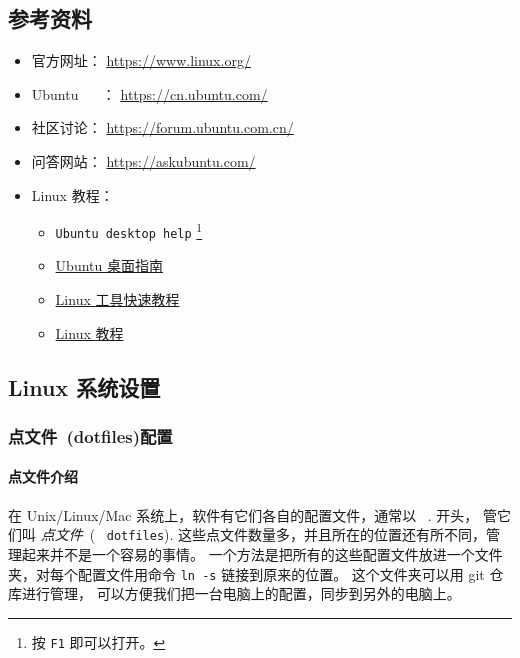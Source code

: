 \documentclass[cn,11pt, simple]{elegantbook}
\begin{document}
\subsection{参考资料}%
\label{sub:linux-refs}

\begin{itemize}
    \item 官方网址： \href{https://www.linux.org/}{https://www.linux.org/}
    \item Ubuntu ~ ~： \href{https://cn.ubuntu.com/}{https://cn.ubuntu.com/}
    \item 社区讨论：
        \href{https://forum.ubuntu.com.cn/}{https://forum.ubuntu.com.cn/}
    \item 问答网站：
        \href{https://askubuntu.com/}{https://askubuntu.com/}
    \item Linux 教程：
        \begin{itemize}
            \item \lstinline{Ubuntu desktop help}
                \footnote{按 \lstinline{F1} 即可以打开。}
            \item \href{https://help.ubuntu.com/lts/ubuntu-help/index.html}
                {Ubuntu 桌面指南}
            \item \href{https://linuxtools-rst.readthedocs.io/zh_CN/latest/}
                {Linux 工具快速教程}
            \item \href{https://dunwu.github.io/linux-tutorial/#/}
                {Linux 教程}
        \end{itemize}
\end{itemize}

\subsection{Linux 系统设置}%
\label{sub:linux-intro}


\subsubsection{点文件~(dotfiles)配置}%
\label{ssub:dotfiles-settings}

\paragraph{点文件介绍}%
\label{sssub:dotfiles-settings-intro}

在 Unix/Linux/Mac 系统上，软件有它们各自的配置文件，通常以 ~.  开头，
管它们叫 \emph{点文件}~(~ \texttt{dotfiles}).
这些点文件数量多，并且所在的位置还有所不同，管理起来并不是一个容易的事情。
一个方法是把所有的这些配置文件放进一个文件夹，对每个配置文件用命令
\lstinline{ln -s} 链接到原来的位置。
这个文件夹可以用 git 仓库进行管理，
可以方便我们把一台电脑上的配置，同步到另外的电脑上。
\end{document}
